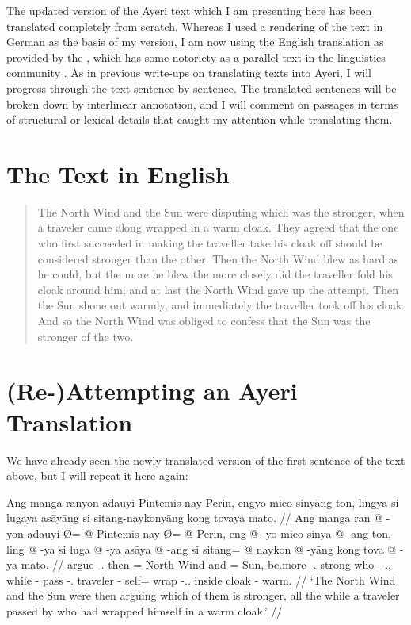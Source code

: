 \documentclass[12pt,paper=a4]{scrartcl}
\begin{document}
The updated version of the Ayeri text which I am presenting here has been translated completely from scratch. Whereas I used a rendering of the text in German as the basis of my \citeyear{becker2004} version, I am now using the English translation as provided by the , which has some notoriety as a parallel text in the linguistics community \autocite[see e.g.][97]{cysouwwälchli2007}. As in previous write-ups on translating texts into Ayeri, I will progress through the text sentence by sentence. The translated sentences will be broken down by interlinear annotation, and I will comment on passages in terms of structural or lexical details that caught my attention while translating them.

\section{The Text in English}

\blockcquote[39]{ipa2007}{The North Wind and the Sun were disputing which was the stronger, when a traveler came along wrapped in a warm cloak. They agreed that the one who first succeeded in making the traveller take his cloak off should be considered stronger than the other. Then the North Wind blew as hard as he could, but the more he blew the more closely did the traveller fold his cloak around him; and at last the North Wind gave up the attempt. Then the Sun shone out warmly, and immediately the traveller took off his cloak. And so the North Wind was obliged to confess that the Sun was the stronger of the two.}

\section{(Re-)Attempting an Ayeri Translation}

We have already seen the newly translated version of the first sentence of the text above, but I will repeat it here again:

\ex %
\begingl
	\glpreamble Ang manga ranyon adauyi Pintemis nay Perin, engyo mico sinyāng ton, lingya si lugaya asāyāng si sitang-naykonyāng kong tovaya mato. //
	\gla Ang manga ran @ -yon adauyi Ø= @ Pintemis nay Ø= @ Perin, eng @ -yo mico sinya @ -ang ton, ling @ -ya si luga @ -ya asāya @ -ang si sitang= @ naykon @ -yāng kong tova @ -ya mato. //
	\glb \AgtT{} \Prog{} argue -\Tpl{}.\N{} then \Top{}= {North Wind} and \Top{}= Sun, be.more -\Tsg{}.\N{} strong who -\Aarg{} \Tpl{}.\Gen{}, while -\Loc{} \Rel{} pass -\Tsg{}.\M{} traveler -\Aarg{} \Rel{} self= wrap -\Tsg{}.\M{}.\Aarg{} inside cloak -\Loc{} warm. //
	\glft `The North Wind and the Sun were then arguing which of them is stronger, all the while a traveler passed by who had wrapped himself in a warm cloak.' //
\endgl
\xe
\end{document}
